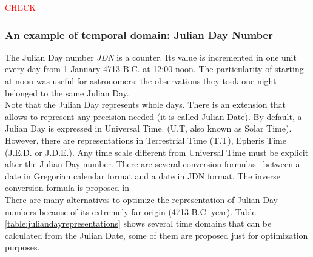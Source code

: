 \textcolor{red}{CHECK}
\subsubsection{\label{subsubsubsec:julian-day-number}An example of temporal domain: Julian Day Number}

The Julian Day number \emph{JDN} \cite{Dir96} is a counter. Its value is incremented in one unit every day from 1 January 4713 B.C. at 12:00 noon. The particularity of starting at noon was useful for astronomers: the observations they took one night belonged to the same Julian Day.\\
Note that the Julian Day represents whole days. There is an extension that allows to represent any precision needed (it is called Julian Date). By default, a Julian Day is expressed in Universal Time. (U.T, also known as Solar Time). However, there are representations in Terrestrial Time (T.T), Epheris Time (J.E.D. or J.D.E.). Any time scale different from Universal Time must be explicit after the Julian Day number. There are several conversion formulas~\cite{Usn}\cite{Wik}\cite{Lea} between a date in Gregorian calendar  format and a date in  JDN format. The inverse conversion formula is proposed in~\cite{Fliegel:1968:LEM:364096.364097}\\

There are many alternatives to optimize the representation of Julian Day numbers because of its extremely far origin (4713 B.C. year). Table \ref{table:juliandayrepresentations} shows several time domains that can be calculated from the Julian Date, some of them are proposed just for optimization purposes.


